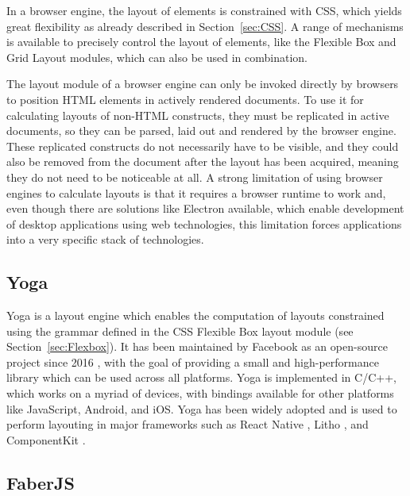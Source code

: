 In a browser engine, the layout of elements is constrained with CSS,
which yields great flexibility as already described in
Section~\ref{sec:CSS}. A range of mechanisms is available to precisely
control the layout of elements, like the Flexible Box and Grid Layout
modules, which can also be used in combination.

The layout module of a browser engine can only be invoked directly by
browsers to position HTML elements in actively rendered documents. To
use it for calculating layouts of non-HTML constructs, they must be
replicated in active documents, so they can be parsed, laid out and
rendered by the browser engine. These replicated constructs do not
necessarily have to be visible, and they could also be removed from
the document after the layout has been acquired, meaning they do not
need to be noticeable at all. A strong limitation of using browser
engines to calculate layouts is that it requires a browser runtime to
work and, even though there are solutions like Electron available,
which enable development of desktop applications using web
technologies, this limitation forces applications into a very specific
stack of technologies.



\subsection{Yoga}
\label{sec:Yoga}

Yoga \parencite{Yoga} is a layout engine which enables the computation
of layouts constrained using the grammar defined in the CSS Flexible
Box layout module (see Section~\ref{sec:Flexbox}). It has been
maintained by Facebook as an open-source project since 2016
\parencite{YogaRelease}, with the goal of providing a small and
high-performance library which can be used across all platforms. Yoga
is implemented in C/C++, which works on a myriad of devices, with
bindings available for other platforms like JavaScript, Android, and
iOS. Yoga has been widely adopted and is used to perform layouting in
major frameworks such as React Native \parencite{ReactNative}, Litho
\parencite{Litho}, and ComponentKit \parencite{ComponentKit}.



\subsection{FaberJS}
\label{sec:FaberJS}

